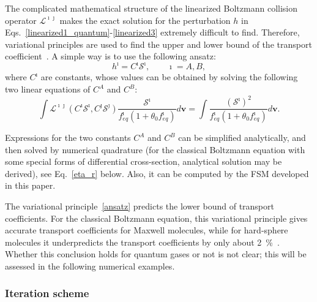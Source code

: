 The complicated mathematical structure of the linearized Boltzmann collision operator $\mathcal{L}^{\imath\jmath}$ makes the exact solution for the perturbation $h$ in Eqs.~\eqref{linearized1_quantum}-\eqref{linearized3} extremely difficult to find. Therefore,  variational principles are used to find the upper and lower bound of the transport coefficient~\cite{Smith_book}. A simple way is to use the following ansatz:
\begin{equation}\label{ansatz}
h^\imath=C^\imath \mathcal{S}^\imath, \quad\quad \imath=A, B,
\end{equation} 
where $C^\imath$ are constants, whose values can be obtained by solving the following two linear equations of $C^A$ and $C^B$:
\begin{equation}\label{variation_ana}
\int \mathcal{L}^{\imath\jmath}(C^\imath\mathcal{S}^\imath,C^\jmath\mathcal{S}^\jmath) \frac{\mathcal{S}^\imath}{f^\imath_{eq}(1+\theta_0f^\imath_{eq})}d\textbf{v}=\int  \frac{(\mathcal{S}^\imath)^2}{f^\imath_{eq}(1+\theta_0f^\imath_{eq})}d\textbf{v}.
\end{equation} 	


Expressions for the two constants $C^A$ and $C^B$ can be simplified analytically, and then solved by numerical quadrature (for the classical Boltzmann equation with some special forms of differential cross-section, analytical solution may be derived), see Eq.~\eqref{eta_r} below. Also, it can be computed by the FSM developed in this paper.


The variational principle~\eqref{ansatz} predicts the lower bound of transport coefficients. For the classical Boltzmann equation, this variational principle gives accurate transport coefficients for Maxwell molecules, while for hard-sphere molecules it underpredicts the transport coefficients by only about 2~\%~\cite{CE}. Whether this conclusion holds for quantum gases or not is not clear; this will be assessed in the following numerical examples.






\subsubsection{Iteration scheme}



